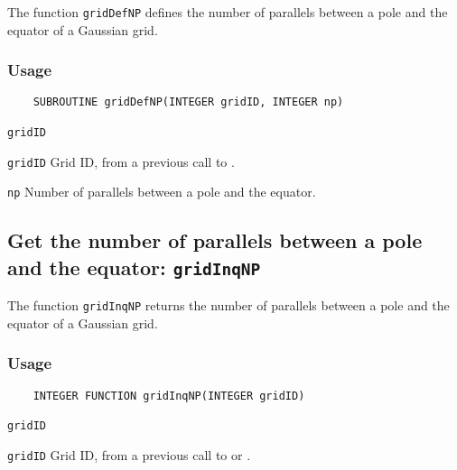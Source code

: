 The function {\texttt{gridDefNP}} defines the number of parallels between a pole and the equator
of a Gaussian grid.

\subsubsection*{Usage}

\begin{verbatim}
    SUBROUTINE gridDefNP(INTEGER gridID, INTEGER np)
\end{verbatim}

\hspace*{4mm}\begin{minipage}[]{15cm}
\begin{deflist}{\texttt{gridID}\ }
\item[\texttt{gridID}]
Grid ID, from a previous call to {}.
\item[\texttt{np}]
Number of parallels between a pole and the equator.

\end{deflist}
\end{minipage}


\subsection{Get the number of parallels between a pole and the equator: \texttt{gridInqNP}}
\label{gridInqNP}

The function {\texttt{gridInqNP}} returns the number of parallels between a pole and the equator
of a Gaussian grid.

\subsubsection*{Usage}

\begin{verbatim}
    INTEGER FUNCTION gridInqNP(INTEGER gridID)
\end{verbatim}

\hspace*{4mm}\begin{minipage}[]{15cm}
\begin{deflist}{\texttt{gridID}\ }
\item[\texttt{gridID}]
Grid ID, from a previous call to {} or {}.

\end{deflist}
\end{minipage}

